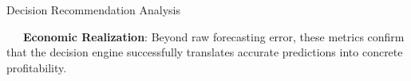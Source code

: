 \documentclass{beamer}
\begin{document}
\begin{frame}{Decision Recommendation Analysis}
\vspace{0.15cm}
\begin{tcolorbox}[enhanced, colback=primaryblue!4, colframe=primaryblue!30, boxrule=0.35pt,
  arc=3.5pt, width=0.98\textwidth, left=4pt, right=4pt, top=2.5pt, bottom=2.5pt, boxsep=0pt,
  halign=center, shadow={0.5pt}{-0.5pt}{0pt}{black!8}]
    \fontsize{5.5pt}{6.5pt}\selectfont
    \textcolor{primaryDark}{~~~\textbf{Economic Realization}: Beyond raw forecasting error, these metrics confirm that the decision engine successfully translates accurate predictions into concrete profitability.}
\end{tcolorbox}
\end{frame}

\end{document}
